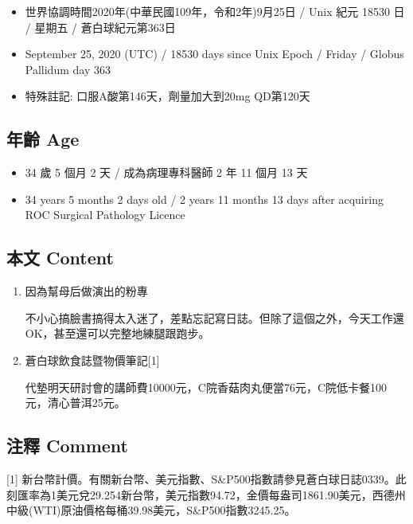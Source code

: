 \documentclass[a5paper, 11pt
]{book}
\providecommand{\tightlist}{%
  \setlength{\itemsep}{0pt}\setlength{\parskip}{0pt}}
\begin{document}
\begin{itemize}
\tightlist
\item
  世界協調時間2020年(中華民國109年，令和2年)9月25日 / Unix 紀元 18530 日
  / 星期五 / 蒼白球紀元第363日
\item
  September 25, 2020 (UTC) / 18530 days since Unix Epoch / Friday /
  Globus Pallidum day 363
\item
  特殊註記: 口服A酸第146天，劑量加大到20mg QD第120天
\end{itemize}

\hypertarget{ux5e74ux9f61-age-24}{%
\subsection{年齡 Age}\label{ux5e74ux9f61-age-24}}

\begin{itemize}
\tightlist
\item
  34 歲 5 個月 2 天 / 成為病理專科醫師 2 年 11 個月 13 天
\item
  34 years 5 months 2 days old / 2 years 11 months 13 days after
  acquiring ROC Surgical Pathology Licence
\end{itemize}

\hypertarget{ux672cux6587-content-24}{%
\subsection{本文 Content}\label{ux672cux6587-content-24}}

\begin{enumerate}
\def\labelenumi{\arabic{enumi}.}
\item
  因為幫母后做演出的粉專

  不小心搞臉書搞得太入迷了，差點忘記寫日誌。但除了這個之外，今天工作還OK，甚至還可以完整地練腿跟跑步。
\item
  蒼白球飲食誌暨物價筆記{[}1{]}

  代墊明天研討會的講師費10000元，C院香菇肉丸便當76元，C院低卡餐100元，清心普洱25元。
\end{enumerate}

\hypertarget{ux6ce8ux91cb-comment-24}{%
\subsection{注釋 Comment}\label{ux6ce8ux91cb-comment-24}}

{[}1{]}
新台幣計價。有關新台幣、美元指數、S\&P500指數請參見蒼白球日誌0339。此刻匯率為1美元兌29.254新台幣，美元指數94.72，金價每盎司1861.90美元，西德州中級(WTI)原油價格每桶39.98美元，S\&P500指數3245.25。
\end{document}
